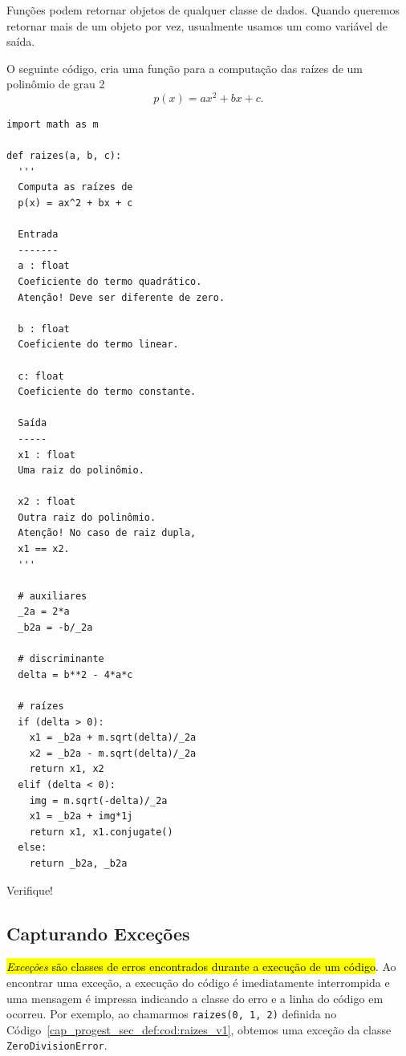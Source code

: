 Funções podem retornar objetos de qualquer classe de dados. Quando queremos retornar mais de um objeto por vez, usualmente usamos um {\PYTHONtuple} como variável de saída.

\begin{ex}
  O seguinte código, cria uma função para a computação das raízes de um polinômio de grau 2
  \begin{equation}
    p(x) = ax^2 + bx + c.
  \end{equation}

\begin{lstlisting}[caption=raizes\_v1.py, label=cap_progest_sec_def:cod:raizes_v1]
import math as m

def raizes(a, b, c):
  '''
  Computa as raízes de
  p(x) = ax^2 + bx + c

  Entrada
  -------
  a : float
  Coeficiente do termo quadrático.
  Atenção! Deve ser diferente de zero.

  b : float 
  Coeficiente do termo linear.

  c: float
  Coeficiente do termo constante.

  Saída
  -----
  x1 : float
  Uma raiz do polinômio.

  x2 : float
  Outra raiz do polinômio.
  Atenção! No caso de raiz dupla,
  x1 == x2.
  '''

  # auxiliares
  _2a = 2*a
  _b2a = -b/_2a

  # discriminante
  delta = b**2 - 4*a*c

  # raízes
  if (delta > 0):
    x1 = _b2a + m.sqrt(delta)/_2a
    x2 = _b2a - m.sqrt(delta)/_2a
    return x1, x2
  elif (delta < 0):
    img = m.sqrt(-delta)/_2a
    x1 = _b2a + img*1j
    return x1, x1.conjugate()
  else:
    return _b2a, _b2a
\end{lstlisting}
  
Verifique!
\end{ex}

\subsection{Capturando Exceções}

\hl{\emph{Exceções} são classes de erros encontrados durante a execução de um código}. Ao encontrar uma exceção, a execução do código {\python} é imediatamente interrompida e uma mensagem é impressa indicando a classe do erro e a linha do código em ocorreu. Por exemplo, ao chamarmos \lstinline+raizes(0, 1, 2)+ definida no Código~\ref{cap_progest_sec_def:cod:raizes_v1}, obtemos uma exceção da classe \lstinline+ZeroDivisionError+.

